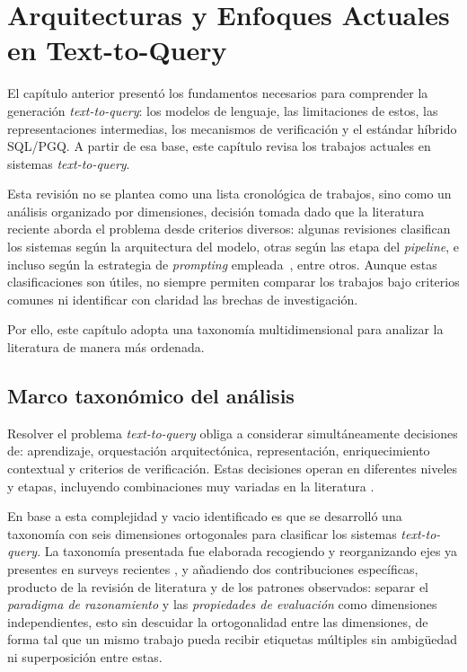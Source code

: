 
\chapter{Arquitecturas y Enfoques Actuales en Text-to-Query}
\label{cap:estado-del-arte}

El capítulo anterior presentó los fundamentos necesarios para comprender la generación \emph{text-to-query}: los modelos de lenguaje, las limitaciones de estos, las representaciones intermedias, los mecanismos de verificación y el estándar híbrido \ac{SQL}/\ac{PGQ}. A partir de esa base, este capítulo revisa los trabajos actuales en sistemas \emph{text-to-query}.

Esta revisión no se plantea como una lista cronológica de trabajos, sino como un análisis organizado por dimensiones, decisión tomada dado que la literatura reciente aborda el problema desde criterios diversos: algunas revisiones clasifican los sistemas según la arquitectura del modelo, otras según las etapa del \emph{pipeline}, e incluso según la estrategia de \emph{prompting} empleada~\cite{NLinterfaces}, entre otros. Aunque estas clasificaciones son útiles, no siempre permiten comparar los trabajos bajo criterios comunes ni identificar con claridad las brechas de investigación.

Por ello, este capítulo adopta una taxonomía multidimensional para analizar la literatura de manera más ordenada.

\section{Marco taxonómico del análisis}
\label{sec:sota-taxonomia}

Resolver el problema \emph{text-to-query} obliga a considerar simultáneamente decisiones de: aprendizaje, orquestación arquitectónica, representación, enriquecimiento contextual y criterios de verificación. Estas decisiones operan en diferentes niveles y etapas, incluyendo combinaciones muy variadas en la literatura \cite{hong2024llmtext2sql,shi2025surveyllmtext2sql,liu2025nli4db}. 

En base a esta complejidad y vacio identificado es que se desarrolló una taxonomía con seis dimensiones ortogonales para clasificar los sistemas \emph{text-to-query}. La taxonomía presentada fue elaborada recogiendo y reorganizando ejes ya presentes en surveys recientes \cite{hong2024llmtext2sql,liu2024nl2sqlsurvey,shi2025surveyllmtext2sql,qin2022recentadvances},
y añadiendo dos contribuciones específicas, producto de la revisión de literatura y de los patrones observados: separar el \emph{paradigma de razonamiento} y las \emph{propiedades de evaluación} como dimensiones independientes, esto sin descuidar la ortogonalidad entre las dimensiones, de forma tal que un mismo trabajo pueda recibir etiquetas múltiples sin ambigüedad ni superposición entre estas.

